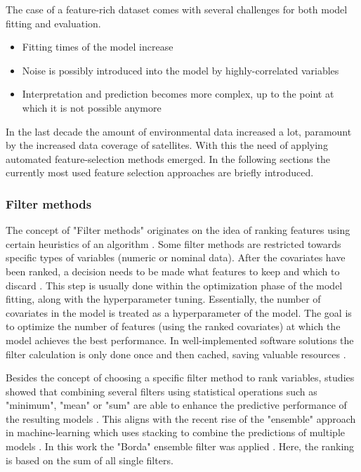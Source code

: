 \documentclass[review]{elsarticle}
\begin{document}
The case of a feature-rich dataset comes with several challenges for both model fitting and evaluation.

\begin{itemize}
	\item Fitting times of the model increase
	\item Noise is possibly introduced into the model by highly-correlated variables \citep{johnstoneiainm.2009}
	\item Interpretation and prediction becomes more complex, up to the point at which it is not possible anymore \citep{johnstoneiainm.2009}
\end{itemize}

\noindent In the last decade the amount of environmental data increased a lot, paramount by the increased data coverage of satellites.
With this the need of applying automated feature-selection methods emerged.
In the following sections the currently most used feature selection approaches are briefly introduced.

\subsubsection{Filter methods}

\noindent The concept of "Filter methods" originates on the idea of ranking features using certain heuristics of an algorithm \citep{chandrashekar2014}.
Some filter methods are restricted towards specific types of variables (numeric or nominal data).
After the covariates have been ranked, a decision needs to be made what features to keep and which to discard \citep{drotar2015}.
This step is usually done within the optimization phase of the model fitting, along with the hyperparameter tuning.
Essentially, the number of covariates in the model is treated as a hyperparameter of the model.
The goal is to optimize the number of features (using the ranked covariates) at which the model achieves the best performance.
In well-implemented software solutions the filter calculation is only done once and then cached, saving valuable resources \citep{mlr}.

Besides the concept of choosing a specific filter method to rank variables, studies showed that combining several filters using statistical operations such as "minimum", "mean" or "sum" are able to enhance the predictive performance of the resulting models \citep{abeel2010, drotar2017a}.
This aligns with the recent rise of the "ensemble" approach in machine-learning which uses stacking to combine the predictions of multiple models \citep{polikar2012, feurer2015}.
In this work the "Borda" ensemble filter was applied \citep{drotar2017a}.
Here, the ranking is based on the sum of all single filters.
\end{document}
